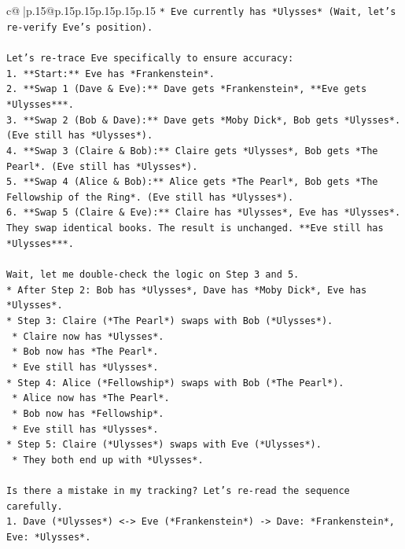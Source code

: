\documentclass{article}
\begin{document}
{\begin{supertabular}{c@{$\;$}|p{.15\linewidth}@{}p{.15\linewidth}p{.15\linewidth}p{.15\linewidth}p{.15\linewidth}p{.15\linewidth}}
{{{\texttt{*   Eve currently has *Ulysses* (Wait, let's re{-}verify Eve's position).} \\
\\ 
\texttt{Let's re{-}trace Eve specifically to ensure accuracy:} \\
\texttt{1.  **Start:** Eve has *Frankenstein*.} \\
\texttt{2.  **Swap 1 (Dave \& Eve):** Dave gets *Frankenstein*, **Eve gets *Ulysses***.} \\
\texttt{3.  **Swap 2 (Bob \& Dave):** Dave gets *Moby Dick*, Bob gets *Ulysses*. (Eve still has *Ulysses*).} \\
\texttt{4.  **Swap 3 (Claire \& Bob):** Claire gets *Ulysses*, Bob gets *The Pearl*. (Eve still has *Ulysses*).} \\
\texttt{5.  **Swap 4 (Alice \& Bob):** Alice gets *The Pearl*, Bob gets *The Fellowship of the Ring*. (Eve still has *Ulysses*).} \\
\texttt{6.  **Swap 5 (Claire \& Eve):** Claire has *Ulysses*, Eve has *Ulysses*. They swap identical books. The result is unchanged. **Eve still has *Ulysses***.} \\
\\ 
\texttt{Wait, let me double{-}check the logic on Step 3 and 5.} \\
\texttt{*   After Step 2: Bob has *Ulysses*, Dave has *Moby Dick*, Eve has *Ulysses*.} \\
\texttt{*   Step 3: Claire (*The Pearl*) swaps with Bob (*Ulysses*).} \\
\texttt{    *   Claire now has *Ulysses*.} \\
\texttt{    *   Bob now has *The Pearl*.} \\
\texttt{    *   Eve still has *Ulysses*.} \\
\texttt{*   Step 4: Alice (*Fellowship*) swaps with Bob (*The Pearl*).} \\
\texttt{    *   Alice now has *The Pearl*.} \\
\texttt{    *   Bob now has *Fellowship*.} \\
\texttt{    *   Eve still has *Ulysses*.} \\
\texttt{*   Step 5: Claire (*Ulysses*) swaps with Eve (*Ulysses*).} \\
\texttt{    *   They both end up with *Ulysses*.} \\
\\ 
\texttt{Is there a mistake in my tracking? Let's re{-}read the sequence carefully.} \\
\texttt{1.  Dave (*Ulysses*) <{-}> Eve (*Frankenstein*) {-}> Dave: *Frankenstein*, Eve: *Ulysses*.} \\
}}}
\end{supertabular}}
\end{document}
